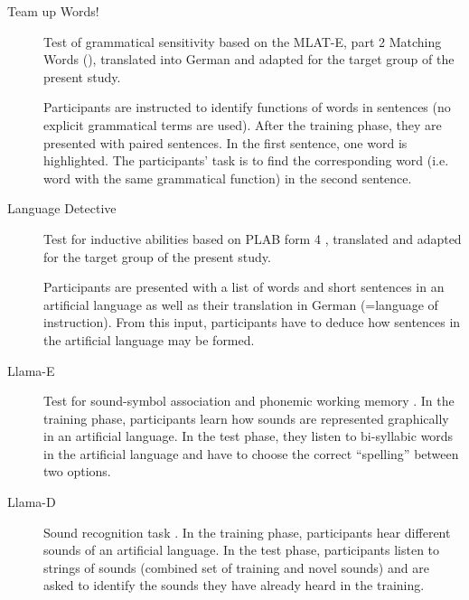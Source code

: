 \documentclass[output=paper]{langsci/langscibook}
\begin{document}
\begin{description}
\item[Team up Words!] Test of grammatical sensitivity based on the MLAT-E, part 2 Matching Words (\citealt{CarrollSapon2010}), translated into German and adapted for the target group of the present study.

Participants are instructed to identify functions of words in sentences (no explicit grammatical terms are used). After the training phase, they are presented with paired sentences. In the first sentence, one word is highlighted. The participants’ task is to find the corresponding word (i.e. word with the same grammatical function) in the second sentence.

\item[Language Detective] Test for inductive abilities based on PLAB form 4 \citep{PimsleurEtAl2004}, translated and adapted for the target group of the present study.

Participants are presented with a list of words and short sentences in an artificial language as well as their translation in German (=language of instruction). From this input, participants have to deduce how sentences in the artificial language may be formed.

\item[Llama-E] Test for sound-symbol association and phonemic working memory \citep{MearaEtAl2001}. In the training phase, participants learn how sounds are represented graphically in an artificial language. In the test phase, they listen to bi-syllabic words in the artificial language and have to choose the correct “spelling” between two options.

\item[Llama-D] Sound recognition task \citep{MearaEtAl2001}. In the training phase, participants hear different sounds of an artificial language. In the test phase, participants listen to strings of sounds (combined set of training and novel sounds) and are asked to identify the sounds they have already heard in the training.
\end{description}
\end{document}

